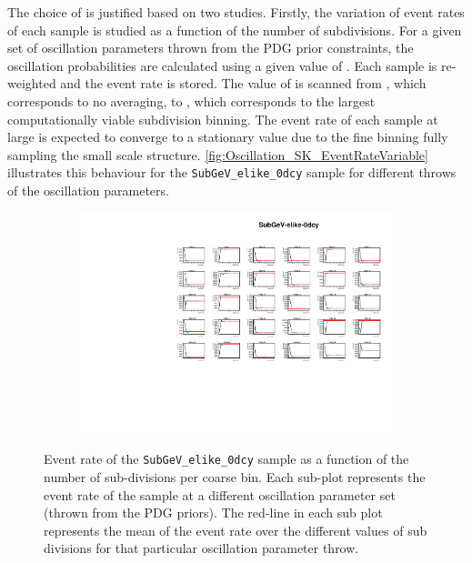 The choice of  is justified based on two studies. Firstly, the variation of event rates of each sample is studied as a function of the number of subdivisions. For a given set of oscillation parameters thrown from the PDG prior constraints, the oscillation probabilities are calculated using a given value of . Each sample is re-weighted and the event rate is stored. The value of  is scanned from , which corresponds to no averaging, to , which corresponds to the largest computationally viable subdivision binning. The event rate of each sample at large  is expected to converge to a stationary value due to the fine binning fully sampling the small scale structure. \autoref{fig:Oscillation_SK_EventRateVariable} illustrates this behaviour for the \texttt{SubGeV\_elike\_0dcy} sample for  different throws of the oscillation parameters.

\begin{figure}[h]
  \begin{subfigure}[t]{\textwidth}
    \includegraphics[width=\textwidth, trim={0mm 0mm 0mm 0mm}, clip,page=1]{Figures/Oscillation/EventRate_VariableGraphs.pdf}
  \end{subfigure}
  \caption{Event rate of the \texttt{SubGeV\_elike\_0dcy} sample as a function of the number of sub-divisions per coarse bin. Each sub-plot represents the event rate of the sample at a different oscillation parameter set (thrown from the PDG priors). The red-line in each sub plot represents the mean of the event rate over the different values of sub divisions for that particular oscillation parameter throw.}
  \label{fig:Oscillation_SK_EventRateVariable}
\end{figure}

